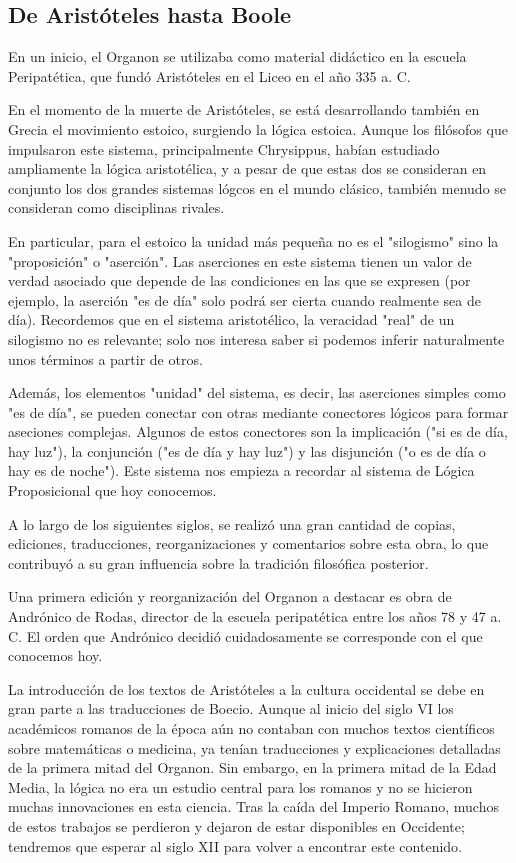 \documentclass{article}
\begin{document}
\subsection{De Aristóteles hasta Boole}

En un inicio, el Organon se utilizaba como material didáctico en la escuela Peripatética, que fundó Aristóteles en el Liceo en el año 335 a. C.

En el momento de la muerte de Aristóteles, se está desarrollando también en Grecia el movimiento estoico, surgiendo la lógica estoica. Aunque los filósofos que impulsaron este sistema, principalmente Chrysippus, habían estudiado ampliamente la lógica aristotélica, y a pesar de que estas dos se consideran en conjunto los dos grandes sistemas lógcos en el mundo clásico, también menudo se consideran como disciplinas rivales.

En particular, para el estoico la unidad más pequeña no es el "silogismo" sino la "proposición" o "aserción". Las aserciones en este sistema tienen un valor de verdad asociado que depende de las condiciones en las que se expresen (por ejemplo, la aserción "es de día" solo podrá ser cierta cuando realmente sea de día). Recordemos que en el sistema aristotélico, la veracidad "real" de un silogismo no es relevante; solo nos interesa saber si podemos inferir naturalmente unos términos a partir de otros.

Además, los elementos "unidad" del sistema, es decir, las aserciones simples como "es de día", se pueden conectar con otras mediante conectores lógicos para formar aseciones complejas. Algunos de estos conectores son la implicación ("si es de día, hay luz"), la conjunción ("es de día y hay luz") y las disjunción ("o es de día o hay es de noche")\cite{algra1999cambridge}. Este sistema nos empieza a recordar al sistema de Lógica Proposicional que hoy conocemos.

A lo largo de los siguientes siglos, se realizó una gran cantidad de copias, ediciones, traducciones, reorganizaciones y comentarios sobre esta obra, lo que contribuyó a su gran influencia sobre la tradición filosófica posterior.

Una primera edición y reorganización del Organon a destacar es obra de Andrónico de Rodas, director de la escuela peripatética entre los años 78 y 47 a. C. El orden que Andrónico decidió cuidadosamente se corresponde con el que conocemos hoy\cite{hatzimichali2013texts}.

La introducción de los textos de Aristóteles a la cultura occidental se debe en gran parte a las traducciones de Boecio. Aunque al inicio del siglo VI los académicos romanos de la época aún no contaban con muchos textos científicos sobre matemáticas o medicina, ya tenían traducciones y explicaciones detalladas de la primera mitad del Organon\cite{charles2004latin}. Sin embargo, en la primera mitad de la Edad Media, la lógica no era un estudio central para los romanos y no se hicieron muchas innovaciones en esta ciencia\cite{marebon2008logic}. Tras la caída del Imperio Romano, muchos de estos trabajos se perdieron y dejaron de estar disponibles en Occidente; tendremos que esperar al siglo XII para volver a encontrar este contenido.
\end{document}

